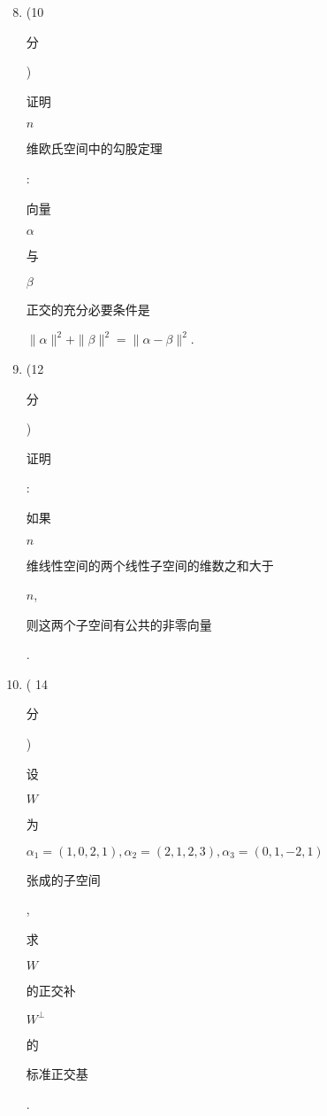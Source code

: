 \documentclass[10pt]{article}
\begin{document}
\begin{enumerate}
  \setcounter{enumi}{7}
  \item (10 \begin{CJK}{UTF8}{mj}分\end{CJK}) \begin{CJK}{UTF8}{mj}证明\end{CJK} $n$ \begin{CJK}{UTF8}{mj}维欧氏空间中的勾股定理\end{CJK}: \begin{CJK}{UTF8}{mj}向量\end{CJK} $\alpha$ \begin{CJK}{UTF8}{mj}与\end{CJK} $\beta$ \begin{CJK}{UTF8}{mj}正交的充分必要条件是\end{CJK} $\|\alpha\|^{2}+\|\beta\|^{2}=\|\alpha-\beta\|^{2}$.

  \item (12 \begin{CJK}{UTF8}{mj}分\end{CJK}) \begin{CJK}{UTF8}{mj}证明\end{CJK}: \begin{CJK}{UTF8}{mj}如果\end{CJK} $n$ \begin{CJK}{UTF8}{mj}维线性空间的两个线性子空间的维数之和大于\end{CJK} $n$, \begin{CJK}{UTF8}{mj}则这两个子空间有公共的非零向量\end{CJK}.

  \item ( 14 \begin{CJK}{UTF8}{mj}分\end{CJK}) \begin{CJK}{UTF8}{mj}设\end{CJK} $W$ \begin{CJK}{UTF8}{mj}为\end{CJK} $\alpha_{1}=(1,0,2,1), \alpha_{2}=(2,1,2,3), \alpha_{3}=(0,1,-2,1)$ \begin{CJK}{UTF8}{mj}张成的子空间\end{CJK}, \begin{CJK}{UTF8}{mj}求\end{CJK} $W$ \begin{CJK}{UTF8}{mj}的正交补\end{CJK} $W^{\perp}$ \begin{CJK}{UTF8}{mj}的\end{CJK} \begin{CJK}{UTF8}{mj}标准正交基\end{CJK}.


\end{enumerate}
\end{document}
